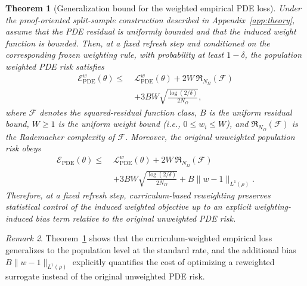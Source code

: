 \documentclass{article}
\theoremstyle{plain}
\newtheorem{theorem}{Theorem}[section]
\theoremstyle{definition}
\theoremstyle{remark}
\newtheorem{remark}[theorem]{Remark}
\begin{document}
\begin{theorem}[Generalization bound for the weighted empirical PDE loss]
	\label{thm:main_generalization}
	Under the proof-oriented split-sample construction described in
	Appendix~\ref{app:theory}, assume that the PDE residual is uniformly
	bounded and that the induced weight function is bounded.
	Then, at a fixed refresh step and conditioned on the corresponding
	frozen weighting rule, with probability at least $1-\delta$, the
	population weighted PDE risk satisfies
	\begin{equation}
		\begin{aligned}
			\mathcal{E}_{\mathrm{PDE}}^{w}(\theta)
			\leqslant\;&
			\mathcal{L}_{\mathrm{PDE}}^{w}(\theta)
			+
			2W\,\mathfrak{R}_{N_\Omega}(\mathcal{F}) \\
			&+
			3BW\sqrt{\frac{\log(2/\delta)}{2N_\Omega}},
		\end{aligned}
		\label{eq:main_weighted_generalization}
	\end{equation}
	where $\mathcal{F}$ denotes the squared-residual function class,
	$B$ is the uniform residual bound,
	$W\geqslant 1$ is the uniform weight bound (i.e., $0\leqslant w_i\leqslant W$),
	and $\mathfrak{R}_{N_\Omega}(\mathcal{F})$ is the Rademacher complexity
	of $\mathcal{F}$.
	Moreover, the original unweighted population risk obeys
	\begin{equation}
		\begin{aligned}
			\mathcal{E}_{\mathrm{PDE}}(\theta)
			\leqslant\;&
			\mathcal{L}_{\mathrm{PDE}}^{w}(\theta)
			+
			2W\,\mathfrak{R}_{N_\Omega}(\mathcal{F}) \\
			&+
			3BW\sqrt{\frac{\log(2/\delta)}{2N_\Omega}}
			+
			B\|w-1\|_{L^1(\rho)}.
		\end{aligned}
		\label{eq:main_unweighted_generalization}
	\end{equation}
	Therefore, at a fixed refresh step, curriculum-based reweighting
	preserves statistical control of the induced weighted objective up to an
	explicit weighting-induced bias term relative to the original
	unweighted PDE risk.
\end{theorem}

\begin{remark}
	Theorem~\ref{thm:main_generalization} shows that the curriculum-weighted empirical loss generalizes to the population level at the standard rate, and the additional bias $B\|w-1\|_{L^1(\rho)}$ explicitly quantifies the cost of optimizing a reweighted surrogate instead of the original unweighted PDE risk.
\end{remark}
\end{document}
